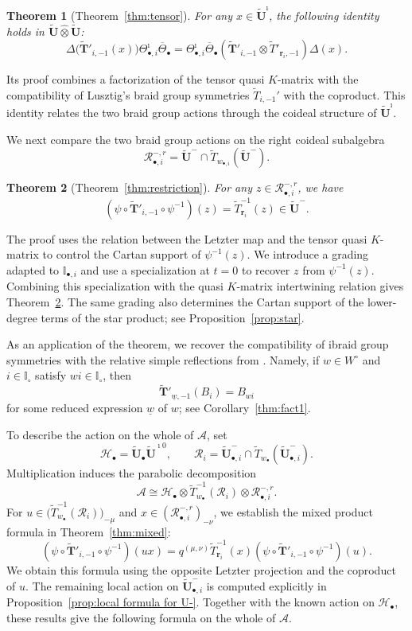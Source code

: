 \documentclass[a4paper,reqno,12pt]{amsart}
\numberwithin{equation}{section}
\theoremstyle{definition}
\theoremstyle{plain}
\newtheorem{introtheorem}{Theorem}
\theoremstyle{definition}
\def\I{\mathbb I}
\def\wI{\I_\circ}
\def\bIi{\I_{\bullet,i}}
\def\bw{w_\bullet}
\def\bwi{w_{\bullet,i}}
\def\br{\mathbf r}
\def\tU{\widetilde{\mathbf U}}
\def\tUi{\widetilde{\mathbf U}^{\imath}}
\def \tbU{\tU_{\bullet}}
\def \tbiU{\tU_{\bullet,i}}
\def\tTD{\widetilde T}
\def\tTT{\widetilde{\mathbf T}}
\def\cA{\mathcal A}
\def\cR{\mathcal R}
\def\cH{\mathcal H}
\newcommand{\tTa}[1]{\tTT'_{#1,-1}}
\begin{document}
\begin{introtheorem}[Theorem~\ref{thm:tensor}]
\label{thm:intro-tensor}
For any $x\in\tUi$, the following identity holds in
$\tU\widehat\otimes\tU$:
\[
  \Delta\bigl(\tTa{i}(x)\bigr)
  \Theta_{\bullet,i}^{\imath}\overline\Theta_\bullet
  =\Theta_{\bullet,i}^{\imath}\overline\Theta_\bullet
   (\tTa{i}\otimes\tTD'_{\br_i,-1})\Delta(x).
\]
\end{introtheorem}

Its proof combines a factorization of the tensor quasi $K$-matrix with
the compatibility of Lusztig's braid group symmetries $\tTD_{i,-1}'$ with the coproduct.
This identity relates the two braid group actions through the
coideal structure of $\tUi$.

We next compare the two braid group actions on the right coideal subalgebra
\[
  \cR_{\bullet,i}^{-,r}
  =\tU^-\cap\tTD_{\bwi}(\tU^-).
\]

\begin{introtheorem}[Theorem~\ref{thm:restriction}]
\label{thm:intro-restriction}
For any $z\in\cR_{\bullet,i}^{-,r}$, we have
\[
  (\psi\circ\tTa{i}\circ\psi^{-1})(z)
  =\tTD_{\br_i}^{-1}(z)\in\tU^-.
\]
\end{introtheorem}

The proof uses the relation between the Letzter map and the tensor quasi
$K$-matrix to control the Cartan support of $\psi^{-1}(z)$. We introduce
a grading adapted to $\bIi$ and use a specialization at $t=0$ to
recover $z$ from $\psi^{-1}(z)$. Combining this specialization with the
quasi $K$-matrix intertwining relation gives
Theorem~\ref{thm:intro-restriction}. The same grading also determines
the Cartan support of the lower-degree terms of the star product; see
Proposition~\ref{prop:star}.

\begin{samepage}
As an application of the theorem, we recover the compatibility
of ibraid group symmetries with the relative simple reflections from
\cite[Theorem~7.13]{WZ23}. Namely, if $w\in W^\circ$ and $i\in\wI$
satisfy $wi\in\wI$, then
\[
  \tTT'_{\underline{w},-1}(B_i)=B_{wi}
\]
for some reduced expression $\underline{w}$ of $w$; see
Corollary~\ref{thm:fact1}.
\end{samepage}

To describe the action on the whole of $\cA$, set
\[
  \cH_\bullet=\tbU\tU^{\imath 0},
  \qquad
  \cR_i=\tbiU^-\cap\tTD_{\bw}(\tbiU^-).
\]
Multiplication induces the parabolic decomposition
\[
  \cA\cong
  \cH_\bullet\otimes\tTD_{\bw}^{-1}(\cR_i)
  \otimes\cR_{\bullet,i}^{-,r}.
\]
For $u\in\bigl(\tTD_{\bw}^{-1}(\cR_i)\bigr)_{-\mu}$ and
$x\in(\cR_{\bullet,i}^{-,r})_{-\nu}$, we establish the mixed product
formula in Theorem~\ref{thm:mixed}:
\[
  (\psi\circ\tTa{i}\circ\psi^{-1})(ux)
  =q^{(\mu,\nu)}\tTD_{\br_i}^{-1}(x)
    (\psi\circ\tTa{i}\circ\psi^{-1})(u).
\]
We obtain this formula using the opposite Letzter projection and the
coproduct of $u$. The remaining local action on $\tbiU^-$ is computed
explicitly in Proposition~\ref{prop:local formula for U-}. Together with
the known action on $\cH_\bullet$, these results give the following
formula on the whole of $\cA$.
\end{document}
